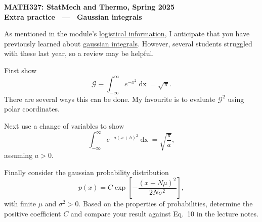 \documentclass[12 pt]{article} %
\newcommand{\cG}{\ensuremath{\mathcal G} }
\newcommand{\si}{\ensuremath{\sigma} }
\renewcommand{\d}[1]{\ensuremath{\mathop{d#1}} }
\begin{document}
\newcommand{\thisunit}{MATH327 Extra (Gaussian int.)}
\newcommand{\moddate}{Last modified 25 Jan.~2025}
\begin{center}
  {\Large \textbf{MATH327: StatMech and Thermo, Spring 2025}} \\[12 pt]
  {\Large \textbf{Extra practice \ --- \ Gaussian integrals}} \\[24 pt]
\end{center}

As mentioned in the module's \href{https://canvas.liverpool.ac.uk/courses/76365/files/12029982}{logistical information}, I anticipate that you have previously learned about \href{https://en.wikipedia.org/wiki/Gaussian_integral}{gaussian integrals}.
However, several students struggled with these last year, so a review may be helpful.

First show
\begin{equation*}
  \cG \equiv \int_{-\infty}^{\infty} e^{-x^2} \d{x} = \sqrt{\pi}.
\end{equation*}
There are several ways this can be done.  My favourite is to evaluate $\cG^2$ using polar coordinates.

Next use a change of variables to show
\begin{equation*}
  \int_{-\infty}^{\infty} e^{-a (x + b)^2} \d{x} = \sqrt{\frac{\pi}{a}},
\end{equation*}
assuming $a > 0$.

Finally consider the gaussian probability distribution
\begin{equation*}
  p(x) = C \exp\left[-\frac{(x - N\mu)^2}{2N\si^2}\right],
\end{equation*}
with finite $\mu$ and $\si^2 > 0$.
Based on the properties of probabilities, determine the positive coefficient $C$ and compare your result against Eq.~10 in the lecture notes.
\end{document}
